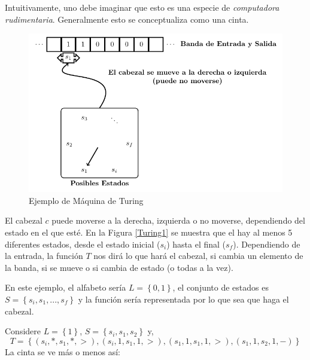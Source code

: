 \documentclass[12pt]{report}
\newcounter{it}
\theoremstyle{largebreak}
\begin{document}
    Intuitivamente, uno debe imaginar que esto es una especie de \textit{computadora rudimentaria}. Generalmente esto se conceptualiza como una cinta.

    \begin{center}
        \label{Turing1}
        \begin{figure}
            \begin{center}
                \includegraphics[scale=1]{images/fig_1.pdf}
            \end{center}
            \caption{Ejemplo de Máquina de Turing}
        \end{figure}
    \end{center}

   El cabezal $c$ puede moverse a la derecha, izquierda o no moverse, dependiendo del estado en el que esté. En la Figura \ref{Turing1} se muestra que el hay al menos 5 diferentes estados, desde el estado inicial ($s_i$) hasta el final ($s_f$). Dependiendo de la entrada, la función $T$ nos dirá lo que hará el cabezal, si cambia un elemento de la banda, si se mueve o si cambia de estado (o todas a la vez).

   En este ejemplo, el alfabeto sería $L=\left\{0,1 \right\}$, el conjunto de estados es $S=\left\{s_i,s_1,...,s_f \right\}$ y la función sería representada por lo que sea que haga el cabezal.

    \begin{exa}
        Considere $L=\left\{1 \right\}$, $S=\left\{s_i,s_1,s_2 \right\}$ y,
        \begin{equation*}
            T=\left\{(s_i,*,s_1,*,>),(s_i,1,s_1,1,>),(s_1,1,s_1,1,>),(s_1,1,s_2,1,-) \right\}
        \end{equation*}
        La cinta se ve más o menos así:

    \end{exa}
\end{document}
